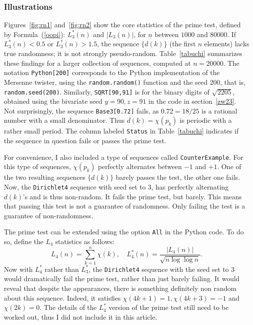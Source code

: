 \documentclass[oneside,10pt]{book}
\begin{document}
\subsubsection{Illustrations}

Figures~\ref{fig:rn1} and~\ref{fig:rn2} show the core statistics of the prime test,
 defined by Formula~(\ref{oopi}): $L^*_3(n)$ and $|L_3(n)|$, for $n$ between
 $\num{1000}$ and $\num{80000}$.  If $L^*_3(n)<0.5$ or $L^*_3(n)>1.5$, the sequence $\{d(k)\}$ (the first $n$ elements) lacks true randomness; it is not
 \textcolor{index}{strongly pseudo-random}. Table~\ref{tabuchi} summarizes these findings for a larger collection of sequences,
 computed at $n=\num{20000}$.
  The notation \texttt{Python[200]} corresponds to the Python implementation
 of the Mersenne twister, using the \texttt{random.random()} function and the seed $200$, that is, \texttt{random.seed(200)}.
 Similarly, \texttt{SQRT[90,91]} is for the binary digits of $\sqrt{2205}$, obtained using the bivariate seed $y=90, z=91$ in the code in section~\ref{zw23}. Not surprisingly, the sequence \texttt{Base3[0.72]} fails, as $0.72=18/25$ is a rational number with a small denominator.
 Thus $d(k)=\chi(p_k)$ is periodic with a rather small period. The column labeled \texttt{Status} in Table~\ref{tabuchi} indicates if the sequence in question fails or passes the prime test.



For convenience, I also included a type of sequences called \texttt{CounterExample}. For this type of sequences, $\chi(p_k)$ perfectly alternates between $-1$ and $+1$. One of the two resulting sequences $\{d(k)\}$ barely passes the test, the other one fails.
Now, the \texttt{Dirichlet4} sequence with seed set to $3$, has perfectly alternating $d(k)$'s and is thus non-random.  It fails the prime test, but barely.
This  means that passing this test is not a guarantee of randomness. Only failing the test is a guarantee of non-randomness.


The prime test can be extended using the option \texttt{All} in the Python code. To do so, define the $L_4$ statistics as follows:
\begin{equation}
L_4(n)=\sum_{k=1}^n \chi(k), \quad L^*_4(n)=\frac{|L_4(n)|}{\sqrt{n\log\log n}}.\label{l4}
\end{equation}
Now with $L^*_4$ rather than $L^*_3$, the \texttt{Dirichlet4} sequence with the seed set to $3$ would dramatically fail the prime test,
 rather than just barely failing. It would reveal that despite the appearances, there is something definitely non random about this sequence. Indeed, it satisfies
$\chi(4k+1)=1, \chi(4k+3)=-1$ and $\chi(2k)=0$.  The details of the $L^*_4$ version of the prime test still need to be worked out, thus I did not include it in this article.
\end{document}
